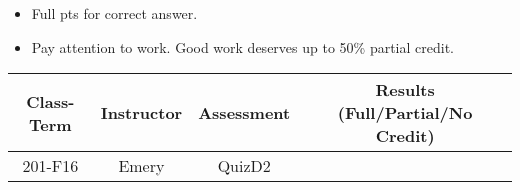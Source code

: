 \begin{rubric}

\begin{itemize}
	\item Full pts for correct answer. 
	\item Pay attention to work. Good work deserves up to 50\% partial credit.
\end{itemize}
\end{rubric}

\begin{outcomes}

\begin{center}
	\begin{tabular}{cccc}
		\hline \hline
                Class-Term & Instructor & Assessment & Results (Full/Partial/No Credit) \\
		\hline
                201-F16 & Emery & QuizD2 &  \\
		\hline
	\end{tabular}
\end{center}

\end{outcomes}

\begin{comments}

\end{comments}
